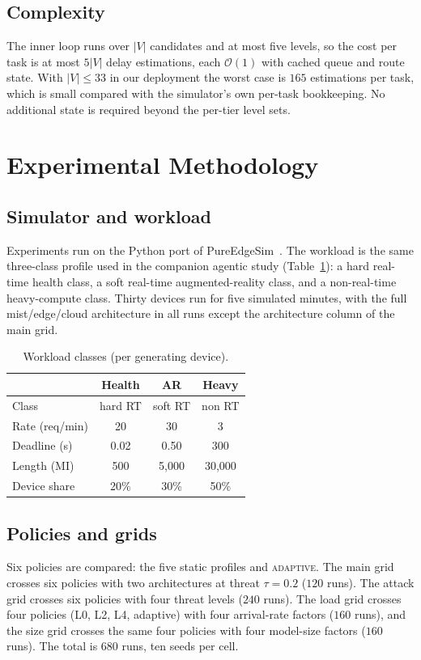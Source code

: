 \documentclass[journal,10pt]{IEEEtran}
\newcommand{\bigO}{\ensuremath{\mathcal{O}}}
\begin{document}
\subsection{Complexity}
The inner loop runs over $|V|$ candidates and at most five levels, so the cost
per task is at most $5|V|$ delay estimations, each $\bigO(1)$ with cached queue
and route state. With $|V|\le33$ in our deployment the worst case is $165$
estimations per task, which is small compared with the simulator's own per-task
bookkeeping. No additional state is required beyond the per-tier level sets.

\section{Experimental Methodology}
\label{sec:exp}

\subsection{Simulator and workload}
Experiments run on the Python port of PureEdgeSim~\cite{mechalikh2021pureedgesim}.
The workload is the same three-class profile used in the companion agentic
study (Table~\ref{tab:p4-workload}): a hard real-time health class, a soft
real-time augmented-reality class, and a non-real-time heavy-compute class.
Thirty devices run for five simulated minutes, with the full mist/edge/cloud
architecture in all runs except the architecture column of the main grid.

\begin{table}[t]
\centering
\footnotesize
\caption{Workload classes (per generating device).}
\label{tab:p4-workload}
\begin{tabular}{@{}lccc@{}}
\toprule
 & Health & AR & Heavy\\
\midrule
Class & hard RT & soft RT & non RT\\
Rate (req/min) & 20 & 30 & 3\\
Deadline (s) & 0.02 & 0.50 & 300\\
Length (MI) & 500 & 5{,}000 & 30{,}000\\
Device share & 20\% & 30\% & 50\%\\
\bottomrule
\end{tabular}
\end{table}

\subsection{Policies and grids}
Six policies are compared: the five static profiles and \textsc{adaptive}. The
main grid crosses six policies with two architectures at threat $\tau=0.2$
($120$ runs). The attack grid crosses six policies with four threat levels
($240$ runs). The load grid crosses four policies (L0, L2, L4, adaptive) with
four arrival-rate factors ($160$ runs), and the size grid crosses the same four
policies with four model-size factors ($160$ runs). The total is $680$ runs,
ten seeds per cell.
\end{document}
